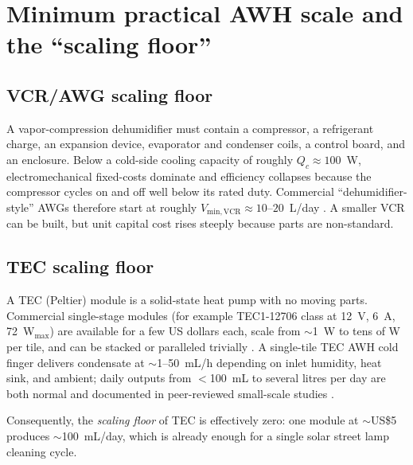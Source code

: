 \documentclass[11pt,a4paper]{article}
\begin{document}
\section{Minimum practical AWH scale and the ``scaling floor''}
\subsection{VCR/AWG scaling floor}
A vapor-compression dehumidifier must contain a compressor, a refrigerant charge, an expansion device, evaporator and condenser coils, a control board, and an enclosure. Below a cold-side cooling capacity of roughly $Q_c\approx 100$~W, electromechanical fixed-costs dominate and efficiency collapses because the compressor cycles on and off well below its rated duty. Commercial ``dehumidifier-style'' AWGs therefore start at roughly $V_{\mathrm{min,VCR}}\approx 10$--$20$~L/day \cite{ieeeref_kim2022_metrics, ieeeref_feng2022_awh}. A smaller VCR can be built, but unit capital cost rises steeply because parts are non-standard.

\subsection{TEC scaling floor}
A TEC (Peltier) module is a solid-state heat pump with no moving parts. Commercial single-stage modules (for example TEC1-12706 class at 12~V, 6~A, 72~W$_{\mathrm{max}}$) are available for a few US dollars each, scale from $\sim$1~W to tens of W per tile, and can be stacked or paralleled trivially \cite{ieeeref_peltier_tec}. A single-tile TEC AWH cold finger delivers condensate at $\sim$1--50~mL/h depending on inlet humidity, heat sink, and ambient; daily outputs from $<$100~mL to several litres per day are both normal and documented in peer-reviewed small-scale studies \cite{ieeeref_small_tec_awh}.

Consequently, the \emph{scaling floor} of TEC is effectively zero: one module at $\sim$US\$5 produces $\sim$100~mL/day, which is already enough for a single solar street lamp cleaning cycle.
\end{document}
